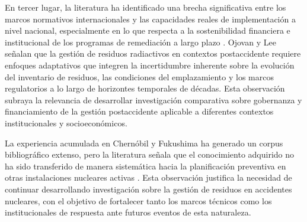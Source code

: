 En tercer lugar, la literatura ha identificado una brecha significativa entre los
marcos normativos internacionales y las capacidades reales de implementación a
nivel nacional, especialmente en lo que respecta a la sostenibilidad financiera
e institucional de los programas de remediación a largo plazo \cite{IAEAGSG152022}.
Ojovan y Lee \cite{Ojovan2011} señalan que la gestión de residuos radiactivos en
contextos postaccidente requiere enfoques adaptativos que integren la incertidumbre
inherente sobre la evolución del inventario de residuos, las condiciones del
emplazamiento y los marcos regulatorios a lo largo de horizontes temporales de
décadas. Esta observación subraya la relevancia de desarrollar investigación
comparativa sobre gobernanza y financiamiento de la gestión postaccidente
aplicable a diferentes contextos institucionales y socioeconómicos.

La experiencia acumulada en Chernóbil y Fukushima ha generado un corpus
bibliográfico extenso, pero la literatura señala que el conocimiento adquirido
no ha sido transferido de manera sistemática hacia la planificación preventiva
en otras instalaciones nucleares activas \cite{Wakeford}. Esta observación
justifica la necesidad de continuar desarrollando investigación sobre la gestión
de residuos en accidentes nucleares, con el objetivo de fortalecer tanto los
marcos técnicos como los institucionales de respuesta ante futuros eventos de
esta naturaleza.
